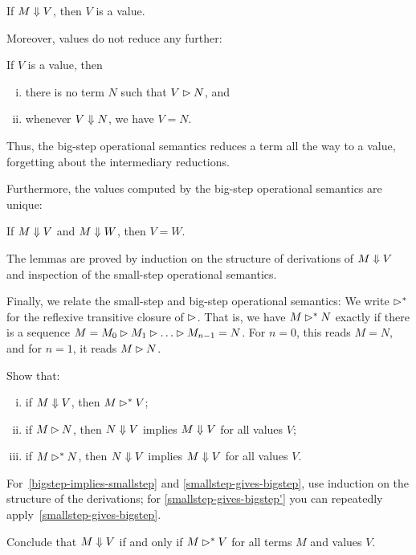 \begin{lemma}
  If \(M \Downarrow V\), then \(V\) is a value.
\end{lemma}

Moreover, values do not reduce any further:

\begin{lemma}
  If \(V\) is a value, then
  \begin{enumerate}[(i)]
  \item there is no term \(N\) such that \(V \rhd N\), and
  \item whenever \(V \Downarrow N\), we have \(V = N\).
  \end{enumerate}
\end{lemma}

Thus, the big-step operational semantics reduces a term all the way to a value,
forgetting about the intermediary reductions.

Furthermore, the values computed by the big-step operational semantics are
unique:
\begin{lemma}
  If \(M \Downarrow V\) and \(M \Downarrow W\), then \(V = W\).
\end{lemma}


The lemmas are proved by induction on the structure of derivations of
\(M \Downarrow V\) and inspection of the small-step operational semantics.

Finally, we relate the small-step and big-step operational semantics:
%
We write \(\rhd^\ast\) for the reflexive transitive closure of
\(\rhd\). That is, we have \(M \rhd^\ast N\) exactly if there is a
sequence \(M = M_0 \smallstep M_1 \smallstep \dots \smallstep M_{n-1} = N\). For
\(n = 0\), this reads \(M = N\), and for \(n = 1\), it reads \(M \rhd N\).

\begin{exercise}\label{exer:small-and-big-step}
  Show that:
  \begin{enumerate}[(i)]
  \item\label{bigstep-implies-smallstep} if \(M \Downarrow V\), then \(M \rhd^\ast V\);
  \item\label{smallstep-gives-bigstep} if \(M \rhd N\), then
    \(N \Downarrow V\) implies \(M \Downarrow V\) for all values \(V\);
  \item\label{smallstep-gives-bigstep'} if \(M \rhd^\ast N\), then
    \(N \Downarrow V\) implies \(M \Downarrow V\) for all values \(V\).
  \end{enumerate}
  For~\ref{bigstep-implies-smallstep} and \ref{smallstep-gives-bigstep}, use
  induction on the structure of the derivations; for
  \ref{smallstep-gives-bigstep'} you can repeatedly
  apply~\ref{smallstep-gives-bigstep}.

  Conclude that \(M \Downarrow V\) if and only if \(M \rhd^\ast V\) for all
  terms \(M\) and values \(V\).
\end{exercise}

